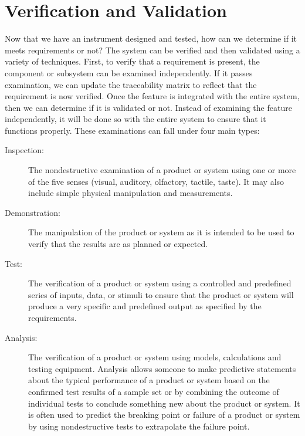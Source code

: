 \chapter{Verification and Validation} 
Now that we have an instrument designed and tested, how can we determine if it meets requirements or not?
The system can be verified and then validated using a variety of techniques.
First, to verify that a requirement is present, the component or subsystem can be examined independently.
If it passes examination, we can update the traceability matrix to reflect that the requirement is now verified.
Once the feature is integrated with the entire system, then we can determine if it is validated or not.
Instead of examining the feature independently, it will be done so with the entire system to ensure that it functions properly.
These examinations can fall under four main types:

{
\renewcommand{\descriptionlabel}[1]{\hspace{\labelsep}\textbf{#1}}
\begin{description}
    \item[Inspection:] The nondestructive examination of a product or system using one or more of the five senses (visual, auditory, olfactory, tactile, taste). 
    It may also include simple physical manipulation and measurements.
    
    \item[Demonstration:] The manipulation of the product or system as it is intended to be used to verify that the results are as planned or expected.								
    
    \item[Test:] The verification of a product or system using a controlled and predefined series of inputs, data, or stimuli to ensure that the product or system will produce a very specific and predefined output as specified by the requirements.								
    
    \item[Analysis:] The verification of a product or system using models, calculations and testing equipment.
    Analysis allows someone to make predictive statements about the typical performance of a product or system based on the confirmed test results of a sample set or by combining the outcome of individual tests to conclude something new about the product or system.
    It is often used to predict the breaking point or failure of a product or system by using nondestructive tests to extrapolate the failure point.
\end{description}
}

